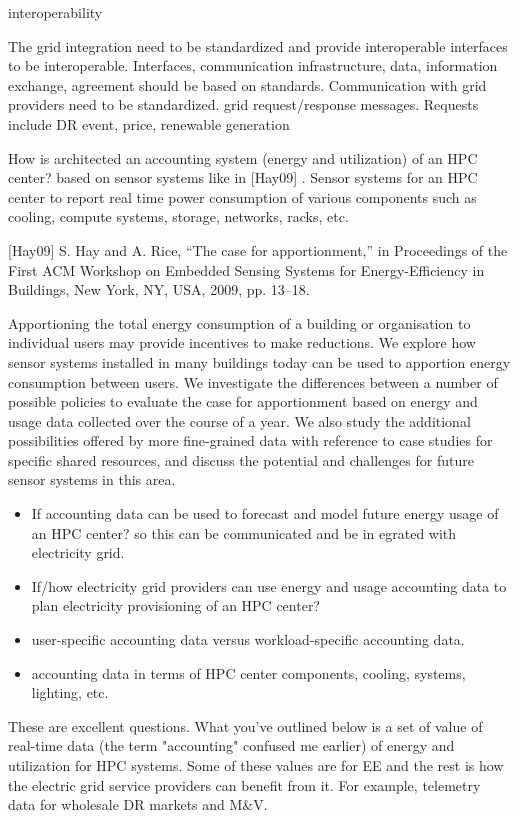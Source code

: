 \documentclass{llncs}
\begin{document}
interoperability

The grid integration need to be standardized and provide interoperable
interfaces to be interoperable. Interfaces, communication infrastructure,
data, information exchange, agreement should be based on standards.
Communication with grid providers need to be standardized. grid
request/response messages. Requests include DR event, price, renewable
generation

How is architected an accounting system (energy and utilization) of an HPC
center? based on sensor systems like in [Hay09] . Sensor systems for an HPC
center to report real time power consumption of various components such as
cooling, compute systems, storage, networks, racks, etc.

[Hay09] S. Hay and A. Rice, ``The case for apportionment,'' in Proceedings
of the First ACM Workshop on Embedded Sensing Systems for Energy-Efficiency
in Buildings, New York, NY, USA, 2009, pp. 13--18.

Apportioning the total energy consumption of a building or organisation to
individual users may provide incentives to make reductions. We explore how
sensor systems installed in many buildings today can be used to apportion
energy consumption between users. We investigate the differences between a
number of possible policies to evaluate the case for apportionment based on
energy and usage data collected over the course of a year. We also study the
additional possibilities offered by more fine-grained data with reference to
case studies for specific shared resources, and discuss the potential and
challenges for future sensor systems in this area.

\begin{itemize}
\item If accounting data can be used to forecast and model future energy usage of an HPC center? so this can be communicated and be in
egrated with electricity grid.
\item If/how electricity grid providers can use energy and usage accounting data to plan electricity provisioning of an HPC center?
\item user-specific accounting data versus workload-specific accounting data.
\item accounting data in terms of HPC center components, cooling, systems, lighting, etc.
\end{itemize}
These are excellent questions. What you've outlined below is a set of value
of real-time data (the term "accounting" confused me earlier) of energy and
utilization for HPC systems. Some of these values are for EE and the rest is
how the electric grid service providers can benefit from it. For example,
telemetry data for wholesale DR markets and M{\&}V.
\end{document}
